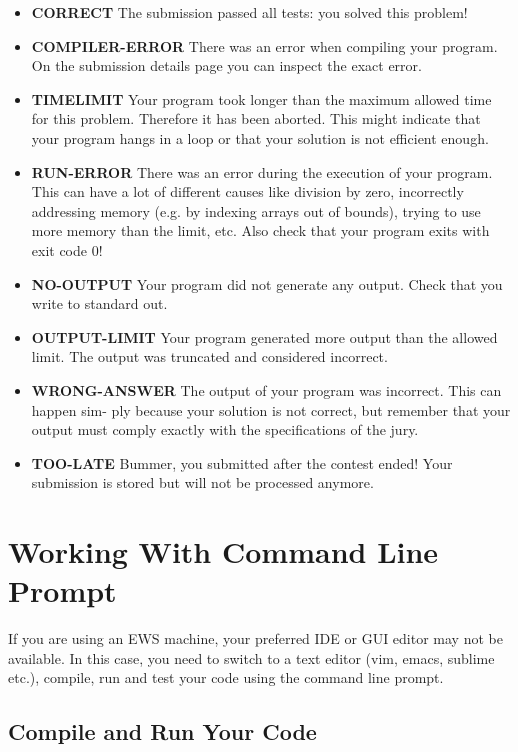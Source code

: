 \documentclass {article}
\begin{document}
\begin{itemize}
    \item \textbf{CORRECT}
        The submission passed all tests:  you solved this problem!
    \item \textbf{COMPILER-ERROR}
        There was an error when compiling your program.  On the submission 
        details page you can inspect the exact error.
    \item \textbf{TIMELIMIT}
        Your program took longer than the maximum allowed time for this
        problem.  Therefore it has been aborted.  This might indicate that
        your program hangs in a loop or that your solution is not efficient
        enough.
    \item \textbf{RUN-ERROR}
        There  was  an  error  during  the  execution  of  your  program.   This
        can have a lot of different causes like division by zero, incorrectly
        addressing memory (e.g.  by indexing arrays out of bounds), trying
        to  use  more  memory  than  the  limit,  etc.   Also  check  that  your
        program exits with exit code 0!
    \item \textbf{NO-OUTPUT}
        Your program did not generate any output.  Check that you write
        to standard out.
    \item \textbf{OUTPUT-LIMIT}
        Your program generated more output than the allowed limit.  The
        output was truncated and considered incorrect.
    \item \textbf{WRONG-ANSWER}
        The output of your program was incorrect.  This can happen sim-
        ply because your solution is not correct, but remember that your
        output must comply exactly with the specifications of the jury.
    \item \textbf{TOO-LATE}
        Bummer, you submitted after the contest ended!  Your submission
        is stored but will not be processed anymore.
\end{itemize}

\newpage
\section{Working With Command Line Prompt}
If you are using an EWS machine, your preferred IDE or GUI editor may not be
available. In this case, you need to switch to a text editor (vim, emacs,
sublime etc.), compile, run and test your code using the command line prompt.
\subsection{Compile and Run Your Code}
\end{document}
